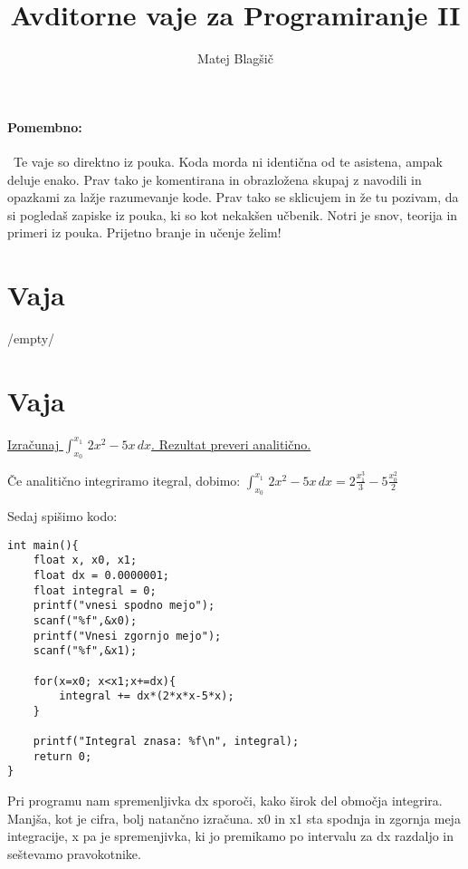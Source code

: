 \documentclass[a4paper, 12pt]{article}
\title{Avditorne vaje za Programiranje II}
\author{Matej Blagšič}
\begin{document}

	\maketitle
	\thispagestyle{empty}
	\pagebreak
	\setcounter{page}{1}
	\tableofcontents
	\pagebreak
\paragraph{Pomembno:}\
Te vaje so direktno iz pouka. Koda morda ni identična od te asistena, ampak deluje enako. Prav tako je komentirana in obrazložena skupaj z navodili in opazkami za lažje razumevanje kode. Prav tako se sklicujem in že tu pozivam, da si pogledaš zapiske iz pouka, ki so kot nekakšen učbenik. Notri je snov, teorija in primeri iz pouka. Prijetno branje in učenje želim!
\pagebreak


\section{Vaja}
/empty/
\section{Vaja}

\underline{Izračunaj $\int_{x_0}^{x_1}\, 2x^2-5x\, dx$. Rezultat preveri analitično.}	\

Če analitično integriramo itegral, dobimo: $\int_{x_0}^{x_1}\, 2x^2-5x\, dx = 2\frac{x_1^3}3-5\frac{x_0^2}2$\

Sedaj spišimo kodo:
\begin{lstlisting}
int main(){
	float x, x0, x1;
	float dx = 0.0000001;
	float integral = 0;
	printf("vnesi spodno mejo");
	scanf("%f",&x0);
	printf("Vnesi zgornjo mejo");
	scanf("%f",&x1);

	for(x=x0; x<x1;x+=dx){
		integral += dx*(2*x*x-5*x);
	}

	printf("Integral znasa: %f\n", integral);
	return 0;
}
\end{lstlisting}
Pri programu nam spremenljivka dx sporoči, kako širok del območja integrira. Manjša, kot je cifra, bolj natančno izračuna. x0 in x1 sta spodnja in zgornja meja integracije, x pa je spremenjivka, ki jo premikamo po intervalu za dx razdaljo in seštevamo pravokotnike.
	
\end{document}
